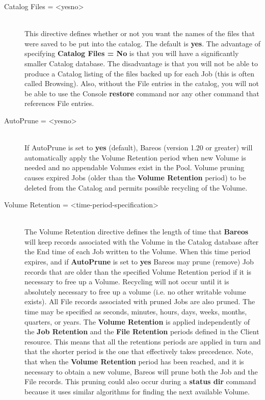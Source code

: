 \begin{description}
\item [Catalog Files = {\textless}yes{\textbar}no{\textgreater}] \hfill \\
This directive defines whether or not you want the names of the files
that were saved to be put into the catalog.  The default is {\bf yes}.
The advantage of specifying {\bf Catalog Files = No} is that you will
have a significantly smaller Catalog database.  The disadvantage is that
you will not be able to produce a Catalog listing of the files backed up
for each Job (this is often called Browsing).  Also, without the File
entries in the catalog, you will not be able to use the Console {\bf
restore} command nor any other command that references File entries.

\label{PoolAutoPrune}
\item [AutoPrune = {\textless}yes{\textbar}no{\textgreater}] \hfill \\
If AutoPrune is set to {\bf yes} (default), Bareos (version 1.20 or
greater) will automatically apply the Volume Retention period when new
Volume is needed and no appendable Volumes exist in the Pool.  Volume
pruning causes expired Jobs (older than the {\bf Volume Retention}
period) to be deleted from the Catalog and permits possible recycling of
the Volume.

\label{VolRetention}
\item [Volume Retention = {\textless}time-period-specification{\textgreater}] \hfill \\
The Volume Retention directive defines the length of time that {\bf
Bareos} will keep records associated with the Volume in
the Catalog database after the End time of each Job written to the
Volume.  When this time period expires, and if {\bf AutoPrune} is set to
{\bf yes} Bareos may prune (remove) Job records that are older than the
specified Volume Retention period if it is necessary to free up a
Volume.  Recycling will not occur until it is absolutely necessary to
free up a volume (i.e. no other writable volume exists).
All File records associated with pruned Jobs are also
pruned.  The time may be specified as seconds, minutes, hours, days,
weeks, months, quarters, or years.  The {\bf Volume Retention} is
applied independently of the {\bf Job Retention} and the {\bf File
Retention} periods defined in the Client resource.  This means that all
the retentions periods are applied in turn and that the shorter period
is the one that effectively takes precedence.  Note, that when the {\bf
Volume Retention} period has been reached, and it is necessary to obtain
a new volume, Bareos will prune both the Job and the File records.  This
pruning could also occur during a {\bf status dir} command because it
uses similar algorithms for finding the next available Volume.


\end{description}
